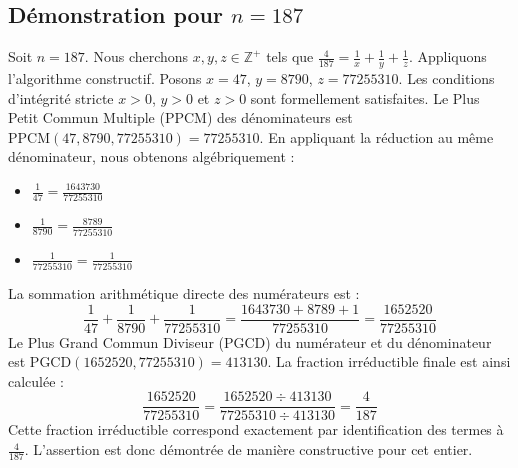 \documentclass[11pt,a4paper]{article}
\begin{document}
\subsection{Démonstration pour $n = 187$}
Soit $n = 187$. Nous cherchons $x, y, z \in \mathbb{Z}^{+}$ tels que $\frac{4}{187} = \frac{1}{x} + \frac{1}{y} + \frac{1}{z}$.
Appliquons l'algorithme constructif. Posons $x = 47$, $y = 8790$, $z = 77255310$.
Les conditions d'intégrité stricte $x > 0$, $y > 0$ et $z > 0$ sont formellement satisfaites.
Le Plus Petit Commun Multiple (PPCM) des dénominateurs est $\text{PPCM}(47, 8790, 77255310) = 77255310$.
En appliquant la réduction au même dénominateur, nous obtenons algébriquement :
\begin{itemize}
    \item $\frac{1}{47} = \frac{1643730}{77255310}$
    \item $\frac{1}{8790} = \frac{8789}{77255310}$
    \item $\frac{1}{77255310} = \frac{1}{77255310}$
\end{itemize}
La sommation arithmétique directe des numérateurs est :
$$ \frac{1}{47} + \frac{1}{8790} + \frac{1}{77255310} = \frac{1643730 + 8789 + 1}{77255310} = \frac{1652520}{77255310} $$
Le Plus Grand Commun Diviseur (PGCD) du numérateur et du dénominateur est $\text{PGCD}(1652520, 77255310) = 413130$.
La fraction irréductible finale est ainsi calculée :
$$ \frac{1652520}{77255310} = \frac{1652520 \div 413130}{77255310 \div 413130} = \frac{4}{187} $$
Cette fraction irréductible correspond exactement par identification des termes à $\frac{4}{187}$. L'assertion est donc démontrée de manière constructive pour cet entier.
\end{document}
